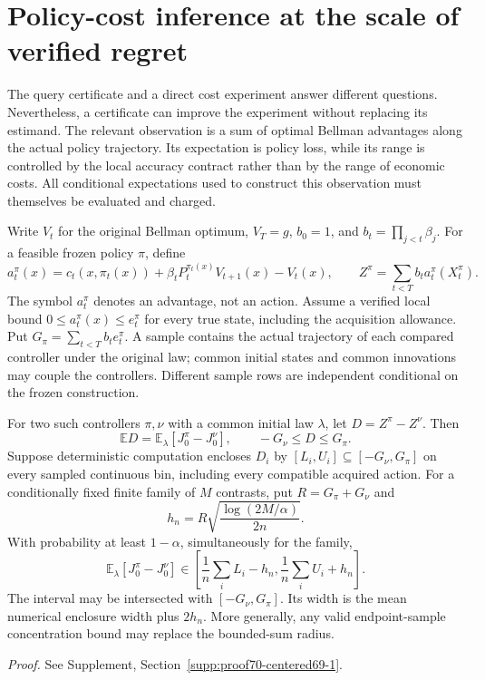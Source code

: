 \section{Policy-cost inference at the scale of verified regret}\label{sec:centered69}
The query certificate and a direct cost experiment answer different questions. Nevertheless, a certificate can improve the experiment without replacing its estimand. The relevant observation is a sum of optimal Bellman advantages along the actual policy trajectory. Its expectation is policy loss, while its range is controlled by the local accuracy contract rather than by the range of economic costs. All conditional expectations used to construct this observation must themselves be evaluated and charged.

Write $V_t$ for the original Bellman optimum, $V_T=g$, $b_0=1$, and $b_t=\prod_{j<t}\beta_j$. For a feasible frozen policy $\pi$, define
\[
 a_t^\pi(x)=c_t(x,\pi_t(x))+\beta_tP_t^{\pi_t(x)}V_{t+1}(x)-V_t(x),
 \qquad Z^\pi=\sum_{t<T}b_t a_t^\pi(X_t^\pi).
\]
The symbol $a_t^\pi$ denotes an advantage, not an action. Assume a verified local bound $0\le a_t^\pi(x)\le e_t^\pi$ for every true state, including the acquisition allowance. Put $G_\pi=\sum_{t<T}b_t e_t^\pi$. A sample contains the actual trajectory of each compared controller under the original law; common initial states and common innovations may couple the controllers. Different sample rows are independent conditional on the frozen construction.

\begin{theorem}\label{thm:centered69}
For two such controllers $\pi,\nu$ with a common initial law $\lambda$, let $D=Z^\pi-Z^\nu$. Then
\begin{equation}\label{eq:centered-identity69}
 \mathbb E D=\mathbb E_\lambda[J_0^\pi-J_0^\nu],
 \qquad -G_\nu\le D\le G_\pi.
\end{equation}
Suppose deterministic computation encloses $D_i$ by $[L_i,U_i]\subseteq[-G_\nu,G_\pi]$ on every sampled continuous bin, including every compatible acquired action. For a conditionally fixed finite family of $M$ contrasts, put $R=G_\pi+G_\nu$ and
\[
 h_n=R\sqrt{\frac{\log(2M/\alpha)}{2n}}.
\]
With probability at least $1-\alpha$, simultaneously for the family,
\begin{equation}\label{eq:centered-ci69}
 \mathbb E_\lambda[J_0^\pi-J_0^\nu]
 \in\left[\frac1n\sum_iL_i-h_n,\frac1n\sum_iU_i+h_n\right].
\end{equation}
The interval may be intersected with $[-G_\nu,G_\pi]$. Its width is the mean numerical enclosure width plus $2h_n$. More generally, any valid endpoint-sample concentration bound may replace the bounded-sum radius.
\end{theorem}
\noindent\emph{Proof.} See Supplement, Section~\ref{supp:proof70-centered69-1}.



